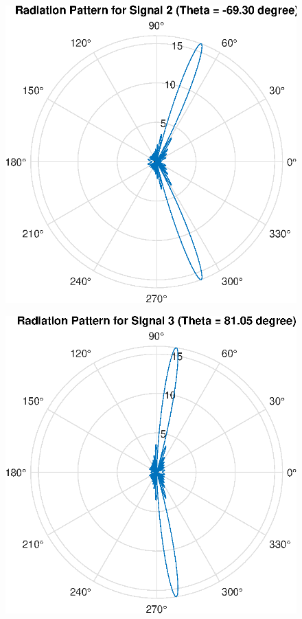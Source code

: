 \begin{figure}[H]
    \centering
    \includegraphics[scale = 0.7]{s2.eps}
\end{figure}
\begin{figure}[H]
    \centering
    \includegraphics[scale = 0.7]{s3.eps}
\end{figure}
